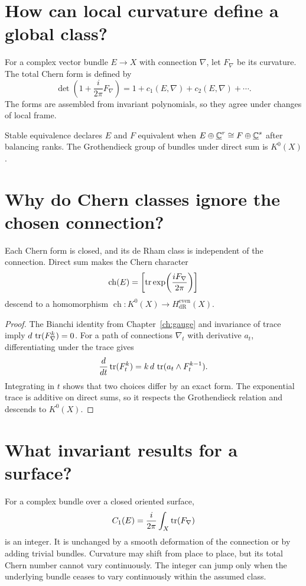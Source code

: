 \section{How can local curvature define a global class?}

For a complex vector bundle $E\to X$ with connection $\nabla$, let
$F_\nabla$ be its curvature.  The total Chern form is defined by
\[
\det\!\left(1+\frac{i}{2\pi}F_\nabla\right)
=1+c_1(E,\nabla)+c_2(E,\nabla)+\cdots.
\]
The forms are assembled from invariant polynomials, so they agree under
changes of local frame.

Stable equivalence declares $E$ and $F$ equivalent when
$E\oplus\underline{\mathbb C}^r\cong F\oplus\underline{\mathbb C}^s$ after balancing ranks.
The Grothendieck group of bundles under direct sum is $K^0(X)$.

\section{Why do Chern classes ignore the chosen connection?}

\begin{theorem}
Each Chern form is closed, and its de Rham class is independent of the
connection.  Direct sum makes the Chern character
\[
\operatorname{ch}(E)=\left[\operatorname{tr}\exp\!\left(\frac{iF_\nabla}{2\pi}\right)\right]
\]
descend to a homomorphism
$\operatorname{ch}:K^0(X)\to H^{\mathrm{even}}_{\mathrm{dR}}(X)$.
\end{theorem}

\begin{proof}
The Bianchi identity from Chapter~\ref{ch:gauge} and invariance of trace imply
$d\,\operatorname{tr}(F_\nabla^k)=0$.  For a path of connections $\nabla_t$ with derivative
$a_t$, differentiating under the trace gives
\[
\frac d{dt}\operatorname{tr}(F_t^k)=k\,d\,\operatorname{tr}(a_t\wedge F_t^{k-1}).
\]
Integrating in $t$ shows that two choices differ by an exact form.  The
exponential trace is additive on direct sums, so it respects the Grothendieck
relation and descends to $K^0(X)$.
\end{proof}

\section{What invariant results for a surface?}

For a complex bundle over a closed oriented surface,
\[
C_1(E)=\frac{i}{2\pi}\int_X\operatorname{tr}(F_\nabla)
\]
is an integer.  It is unchanged by a smooth deformation of the connection or
by adding trivial bundles.  Curvature may shift from place to place, but its
total Chern number cannot vary continuously.  The integer can jump only when
the underlying bundle ceases to vary continuously within the assumed class.

